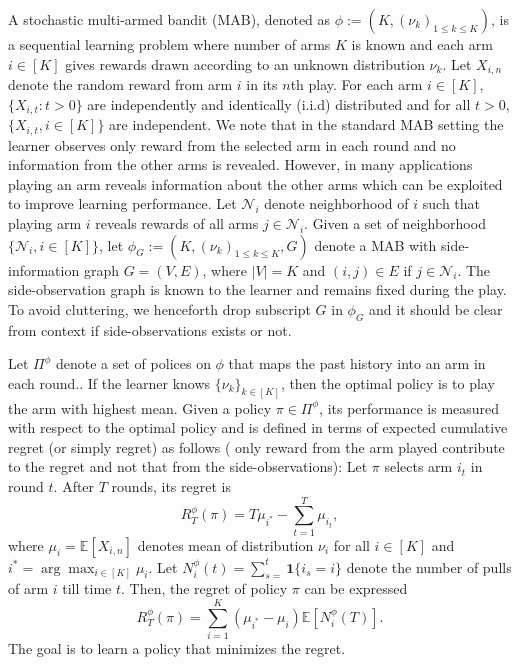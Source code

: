 A stochastic multi-armed bandit (MAB), denoted as $\phi:=(K, (\nu_k)_{1 \leq k \leq K})$, is a sequential learning problem where number of arms $K$ is known and each arm $i \in [K]$ gives rewards drawn according to an unknown distribution $\nu_k$. Let $X_{i,n}$ denote the random reward from arm $i$ in its $n$th play. For each arm $i\in [K]$, $\{X_{i,t}: t>0\}$ are independently and identically (i.i.d) distributed and for all $t>0$, $\{X_{i,t}, i \in [K]\}$ are independent. We note that in the standard MAB setting the learner observes only reward from the selected arm in each round and no information from the other arms is revealed. However, in many applications playing an arm reveals information about the other arms which can be exploited to improve learning performance. Let $\mathcal{N}_i$  denote neighborhood of $i$ such that playing arm $i$ reveals rewards of all arms $j \in \mathcal{N}_i$.  Given a set of neighborhood $\{\mathcal{N}_i, i\in [K]\}$, let $\phi_G:=(K, (\nu_k)_{1\leq k\leq K}, G)$ denote a MAB with side-information graph $G=(V,E)$, where $|V|=K$ and $(i,j)\in E$ if $j \in \mathcal{N}_i$. The side-observation graph is known to the learner and remains fixed during the play. To avoid cluttering, we henceforth drop subscript $G$ in $\phi_G$ and it should be clear from context if side-observations exists or not. 

Let $\Pi^{\phi}$ denote a set of polices on $\phi$ that maps the past history into an arm in each round.. If the learner knows $\{\nu_k\}_{k \in [K]}$, then the optimal policy is to play the arm with highest mean. Given a policy $\pi \in \Pi^{\phi}$, its performance is measured with respect to the optimal policy and is defined in terms of expected cumulative regret (or simply regret) as follows ( only reward from the arm played contribute to the regret and not that from the side-observations):  Let $\pi$ selects arm $i_t$ in round $t$. After $T$ rounds, its regret is 
\begin{equation}
\label{eqn:BanditRegret}
R^\phi_T(\pi)= T \mu_{i^*}- \sum_{t=1}^{T}\mu_{i_t},
\end{equation} 
where $\mu_i=\mathbb{E}[X_{i,n}]$ denotes mean of distribution  $\nu_i$ for all $i\in [K]$ and  $i^*= \arg\max_{i \in [K]} \mu_i$. Let $N^\phi_i(t)=\sum_{s=}^{t}\boldsymbol{1}\{i_s=i\}$ denote the number of pulls of arm $i$ till time $t$. Then, the regret of policy $\pi$ can be expressed 
\[R^\phi_T(\pi)=\sum_{i=1}^{K}(\mu_{i^*}-\mu_i)\mathbb{E}[N^\phi_i(T)].\]
The goal is to learn a policy that minimizes the regret.  

